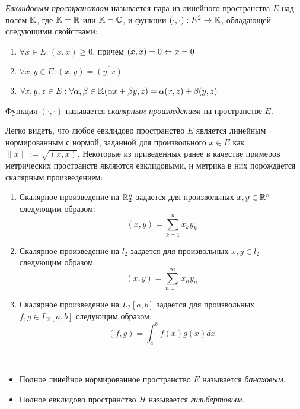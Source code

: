 \begin{definition}
	\textit{Евклидовым пространством} называется пара из линейного пространства $E$ над полем $\mathbb{K}$, где $\mathbb{K} = \mathbb{R}$ или $\mathbb{K} = \mathbb{C}$, и функции $(\cdot, \cdot) : E^2 \to \mathbb{K}$, обладающей следующими свойствами:
	\begin{enumerate}
		\item $\forall x \in E: (x, x) \ge 0$, причем $(x, x) = 0 \Leftrightarrow x = 0$
		\item $\forall x, y \in E: (x, y) = \overline{(y, x)}$
		\item $\forall x, y, z \in E: \forall \alpha, \beta \in \mathbb{K} (\alpha x + \beta y, z) = \alpha(x, z) + \beta(y, z)$
	\end{enumerate}

	Функция $(\cdot, \cdot)$ называется \textit{скалярным произведением} на пространстве $E$.
\end{definition}

\begin{example}
	Легко видеть, что любое евклидово пространство $E$ является линейным нормированным с нормой, заданной для произвольного $x \in E$ как $\|x\| := \sqrt{(x, x)}$. Некоторые из приведенных ранее в качестве примеров метрических пространств являются евклидовыми, и метрика в них порождается скалярным произведением:
	\begin{enumerate}
		\item Скалярное произведение на $\mathbb{R}^n_2$ задается для произвольных $x, y \in \mathbb{R}^n$ следующим образом:
  		\[(x, y) = \sum_{k = 1}^n x_ky_k\]

		\item Скалярное произведение на $l_2$ задается для произвольных $x, y \in l_2$ следующим образом:
		\[(x, y) = \sum_{n = 1}^\infty x_ny_n\]

		\item Скалярное произведение на $L_2[a, b]$ задается для произвольных $f, g \in L_2[a, b]$ следующим образом:
		\[(f, g) = \int_a^b f(x)g(x)dx\]
	\end{enumerate}
\end{example}

\begin{definition}~
	\begin{itemize}
		\item Полное линейное нормированное пространство $E$ называется \textit{банаховым}.
		\item Полное евклидово пространство $H$ называется \textit{гильбертовым}.
	\end{itemize}
\end{definition}
